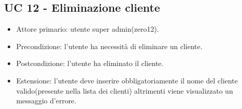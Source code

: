 \subsection{UC 12 - Eliminazione cliente}
    \begin{itemize}
        \item Attore primario: utente super admin(zero12).
        \item Precondizione: l'utente ha necessità di eliminare un cliente.
        \item Postcondizione: l'utente ha eliminato il cliente.
        \item Estensione: l'utente deve inserire obbligatoriamente il nome del cliente valido(presente nella lista dei clienti) altrimenti viene visualizzato un messaggio d'errore.
    \end{itemize}

